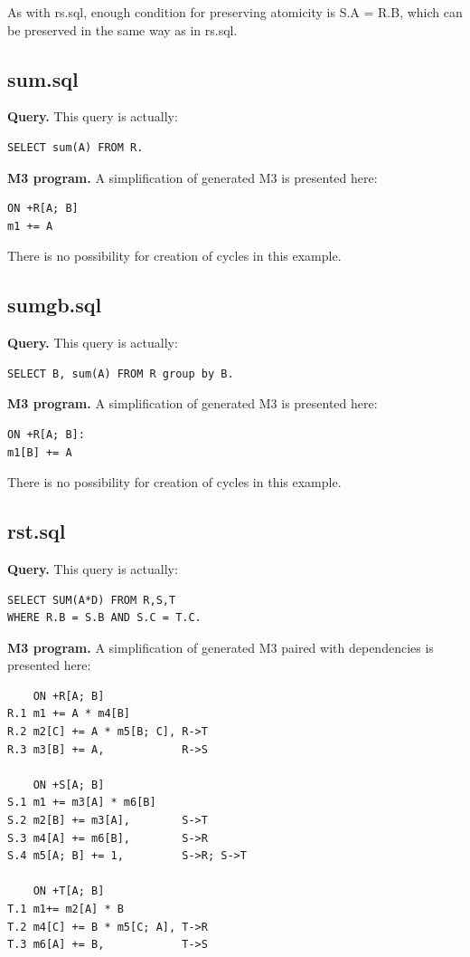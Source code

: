 \documentclass{sig-semester}
\begin{document}
As with rs.sql, enough condition for preserving atomicity is S.A = R.B, which can be preserved in the same way as in rs.sql.

\subsection{sum.sql}
\textbf{Query.} This query is actually:
\begin{verbatim}
SELECT sum(A) FROM R.
\end{verbatim}

\textbf{M3 program.} A simplification of generated M3 is presented here:
\begin{verbatim}
ON +R[A; B]
m1 += A
\end{verbatim}

There is no possibility for creation of cycles in this example.

\subsection{sumgb.sql}
\textbf{Query.} This query is actually:
\begin{verbatim}
SELECT B, sum(A) FROM R group by B.
\end{verbatim}

\textbf{M3 program.} A simplification of generated M3 is presented here:
\begin{verbatim}
ON +R[A; B]:
m1[B] += A
\end{verbatim}

There is no possibility for creation of cycles in this example.

\subsection{rst.sql}
\textbf{Query.} This query is actually:
\begin{verbatim}
SELECT SUM(A*D) FROM R,S,T 
WHERE R.B = S.B AND S.C = T.C.
\end{verbatim}

\textbf{M3 program.} A simplification of generated M3 paired with dependencies is presented here:
\begin{verbatim}
    ON +R[A; B]
R.1 m1 += A * m4[B]
R.2 m2[C] += A * m5[B; C], R->T
R.3 m3[B] += A,            R->S

    ON +S[A; B] 
S.1 m1 += m3[A] * m6[B]
S.2 m2[B] += m3[A],        S->T
S.3 m4[A] += m6[B],        S->R
S.4 m5[A; B] += 1,         S->R; S->T

    ON +T[A; B]
T.1 m1+= m2[A] * B
T.2 m4[C] += B * m5[C; A], T->R
T.3 m6[A] += B,            T->S
\end{verbatim}
\end{document}
